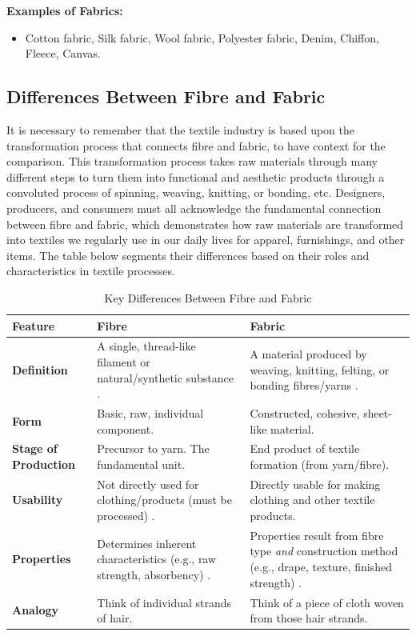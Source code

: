 \textbf{Examples of Fabrics:}
\begin{itemize}[noitemsep, topsep=0pt]
    \item Cotton fabric, Silk fabric, Wool fabric, Polyester fabric, Denim, Chiffon, Fleece, Canvas.
\end{itemize}

\subsection{Differences Between Fibre and Fabric}

It is necessary to remember that the textile industry is based upon the transformation process that connects fibre and fabric, to have context for the comparison. This transformation process takes raw materials through many different steps to turn them into functional and aesthetic products through a convoluted process of spinning, weaving, knitting, or bonding, etc. Designers, producers, and consumers must all acknowledge the fundamental connection between fibre and fabric, which demonstrates how raw materials are transformed into textiles we regularly use in our daily lives for apparel, furnishings, and other items. The table below segments their differences based on their roles and characteristics in textile processes.

\newpage

\begin{table}[h!]
    \centering
    \caption{Key Differences Between Fibre and Fabric}
    \label{tab:fibre_fabric_diff}
    \begin{tabular}{l p{5cm} p{5cm}} %
        \toprule
        \textbf{Feature} & \textbf{Fibre} & \textbf{Fabric} \\
        \midrule
        \textbf{Definition} & A single, thread-like filament or natural/synthetic substance \cite{researchgate}. & A material produced by weaving, knitting, felting, or bonding fibres/yarns \cite{researchgate, hong2024research}. \\
        \textbf{Form} & Basic, raw, individual component. & Constructed, cohesive, sheet-like material. \\
        \textbf{Stage of Production} & Precursor to yarn. The fundamental unit. & End product of textile formation (from yarn/fibre). \\
        \textbf{Usability} & Not directly used for clothing/products (must be processed) \cite{researchgate}. & Directly usable for making clothing and other textile products. \\
        \textbf{Properties} & Determines inherent characteristics (e.g., raw strength, absorbency) \cite{researchgate}. & Properties result from fibre type \textit{and} construction method (e.g., drape, texture, finished strength) \cite{researchgate, hong2024research}. \\
        \textbf{Analogy} & Think of individual strands of hair. & Think of a piece of cloth woven from those hair strands. \\
        \bottomrule
    \end{tabular}
\end{table}

